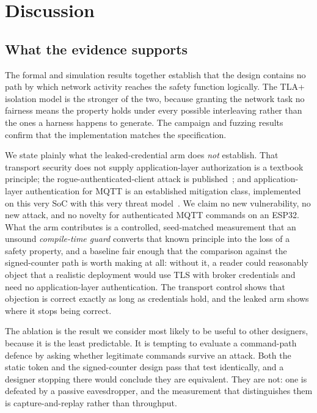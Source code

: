 \section{Discussion}\label{sec:discussion}

\subsection{What the evidence supports}

The formal and simulation results together establish that the design contains no path by which
network activity reaches the safety function logically. The TLA+ isolation model is the stronger
of the two, because granting the network task no fairness means the property holds under every
possible interleaving rather than the ones a harness happens to generate. The campaign and
fuzzing results confirm that the implementation matches the specification.

We state plainly what the leaked-credential arm does \emph{not} establish. That transport
security does not supply application-layer authorization is a textbook principle; the
rogue-authenticated-client attack is published~\cite{pirates2024}; and application-layer
authentication for MQTT is an established mitigation class, implemented on this very SoC with
this very threat model~\cite{amirkhanova2026,mqttl2026}. We claim no new vulnerability, no new
attack, and no novelty for authenticated MQTT commands on an ESP32. What the arm contributes is
a controlled, seed-matched measurement that an unsound \emph{compile-time guard} converts that
known principle into the loss of a safety property, and a baseline fair enough that the
comparison against the signed-counter path is worth making at all: without it, a reader could
reasonably object that a realistic deployment would use TLS with broker credentials and need no
application-layer authentication. The transport control shows that objection is correct exactly
as long as credentials hold, and the leaked arm shows where it stops being correct.

The ablation is the result we consider most likely to be useful to other designers, because it is
the least predictable. It is tempting to evaluate a command-path defence by asking whether
legitimate commands survive an attack. Both the static token and the signed-counter design pass
that test identically, and a designer stopping there would conclude they are equivalent. They are
not: one is defeated by a passive eavesdropper, and the measurement that distinguishes them is
capture-and-replay rather than throughput.

